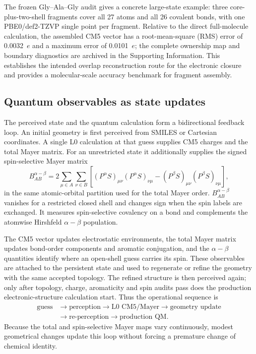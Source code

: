 \documentclass[journal=jctcce,manuscript=article]{achemso}
\begin{document}
The frozen Gly--Ala--Gly audit gives a concrete large-state example: three
core-plus-two-shell fragments cover all 27 atoms and all 26 covalent bonds,
with one PBE0/def2-TZVP single point per fragment.  Relative to the direct
full-molecule calculation, the assembled CM5 vector has a root-mean-square (RMS) error of
0.0032~$e$ and a maximum error of 0.0101~$e$; the complete ownership map and
boundary diagnostics are archived in the Supporting Information.  This
establishes the intended overlap reconstruction route for the electronic
closure and provides a molecular-scale accuracy benchmark for fragment
assembly.

\subsection{Quantum observables as state updates}

The perceived state and the quantum calculation form a bidirectional feedback
loop.  An initial geometry is first perceived from SMILES or
Cartesian coordinates.  A single L0 calculation at that guess supplies CM5
charges and the total Mayer matrix.  For an unrestricted state it additionally
supplies the signed spin-selective Mayer matrix
\begin{equation}
B_{AB}^{\alpha-\beta} =
2\sum_{\mu\in A}\sum_{\nu\in B}
\left[
(P^\alpha S)_{\mu\nu}(P^\alpha S)_{\nu\mu}
-
(P^\beta S)_{\mu\nu}(P^\beta S)_{\nu\mu}
\right],
\label{eq:spin-mayer}
\end{equation}
in the same atomic-orbital partition used for the total Mayer order.
$B_{AB}^{\alpha-\beta}$ vanishes for a restricted closed shell and changes
sign when the spin labels are exchanged.  It measures spin-selective
covalency on a bond and complements the atomwise Hirshfeld
$\alpha-\beta$ population.

The CM5 vector updates electrostatic environments, the total Mayer matrix
updates bond-order components and aromatic conjugation, and the
$\alpha-\beta$ quantities identify where an open-shell guess carries its
spin.  These observables are attached to the persistent state and used to
regenerate or refine the geometry with the same accepted topology.  The
refined structure is then perceived again; only after topology, charge,
aromaticity and spin audits pass does the production electronic-structure
calculation start.  Thus the operational sequence is
\[
\begin{aligned}
\text{guess}&\longrightarrow\text{perception}
\longrightarrow\text{L0 CM5/Mayer}
\longrightarrow\text{geometry update}\\
&\longrightarrow\text{re-perception}
\longrightarrow\text{production QM}.
\end{aligned}
\]
Because the total and spin-selective Mayer maps vary continuously, modest
geometrical changes update this loop without forcing a premature change of
chemical identity.
\end{document}
